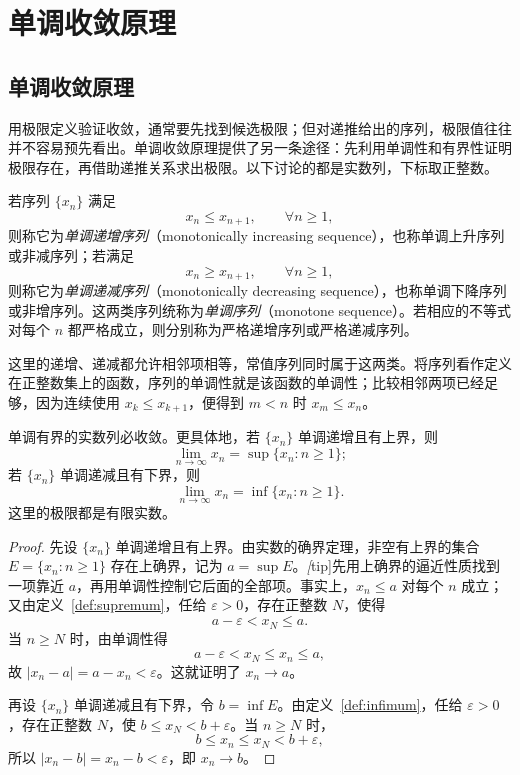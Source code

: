 \documentclass[UTF8,12pt,a4paper,fontset=fandol]{ctexbook}
\begin{document}
\section{单调收敛原理}
\label{sec:monotone-convergence}

\subsection{单调收敛原理}
\label{subsec:monotone-convergence-principle}

用极限定义验证收敛，通常要先找到候选极限；但对递推给出的序列，极限值往往并不容易预先看出。单调收敛原理提供了另一条途径：先利用单调性和有界性证明极限存在，再借助递推关系求出极限。以下讨论的都是实数列，下标取正整数。

\begin{definition}
\label{def:monotone-sequences}
若序列 $\{x_n\}$ 满足
\[
    x_n\leq x_{n+1},\qquad \forall n\geq1,
\]
则称它为\emph{单调递增序列}（monotonically increasing sequence），也称单调上升序列或非减序列；若满足
\[
    x_n\geq x_{n+1},\qquad \forall n\geq1,
\]
则称它为\emph{单调递减序列}（monotonically decreasing sequence），也称单调下降序列或非增序列。这两类序列统称为\emph{单调序列}（monotone sequence）。若相应的不等式对每个 $n$ 都严格成立，则分别称为严格递增序列或严格递减序列。
\end{definition}

这里的递增、递减都允许相邻项相等，常值序列同时属于这两类。将序列看作定义在正整数集上的函数，序列的单调性就是该函数的单调性；比较相邻两项已经足够，因为连续使用 $x_k\leq x_{k+1}$，便得到 $m<n$ 时 $x_m\leq x_n$。

\begin{theorem}[单调收敛原理]
\label{thm:monotone-convergence-principle}
单调有界的实数列必收敛。更具体地，若 $\{x_n\}$ 单调递增且有上界，则
\begin{equation}
    \lim_{n\to\infty}x_n=\sup\{x_n:n\geq1\};
    \label{eq:increasing-sequence-limit-supremum}
\end{equation}
若 $\{x_n\}$ 单调递减且有下界，则
\begin{equation}
    \lim_{n\to\infty}x_n=\inf\{x_n:n\geq1\}.
    \label{eq:decreasing-sequence-limit-infimum}
\end{equation}
这里的极限都是有限实数。
\end{theorem}

\begin{proof}
先设 $\{x_n\}$ 单调递增且有上界。由实数的确界定理，非空有上界的集合 $E=\{x_n:n\geq1\}$ 存在上确界，记为 $a=\sup E$。\emph[tip]{先用上确界的逼近性质找到一项靠近 $a$，再用单调性控制它后面的全部项。}事实上，$x_n\leq a$ 对每个 $n$ 成立；又由定义~\ref{def:supremum}，任给 $\varepsilon>0$，存在正整数 $N$，使得
\[
    a-\varepsilon<x_N\leq a.
\]
当 $n\geq N$ 时，由单调性得
\[
    a-\varepsilon<x_N\leq x_n\leq a,
\]
故 $|x_n-a|=a-x_n<\varepsilon$。这就证明了 $x_n\to a$。

再设 $\{x_n\}$ 单调递减且有下界，令 $b=\inf E$。由定义~\ref{def:infimum}，任给 $\varepsilon>0$，存在正整数 $N$，使 $b\leq x_N<b+\varepsilon$。当 $n\geq N$ 时，
\[
    b\leq x_n\leq x_N<b+\varepsilon,
\]
所以 $|x_n-b|=x_n-b<\varepsilon$，即 $x_n\to b$。
\end{proof}
\end{document}
